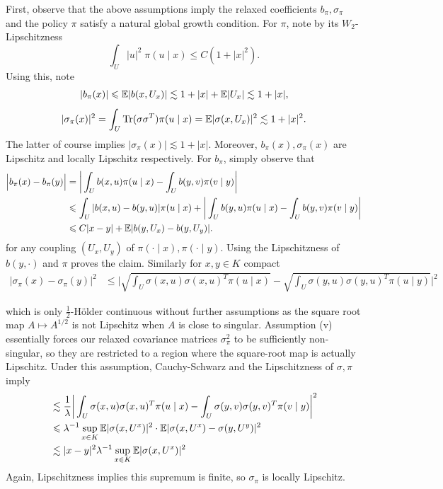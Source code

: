 
First, observe that the above assumptions imply the relaxed coefficients $b_\pi, \sigma_\pi$ and the policy $\pi$ satisfy a natural
global growth condition. For $\pi$, note by its $W_2$-Lipschitzness
%
\[\int_U |u|^2 \; \pi(u \mid x) \leq C(1 + |x|^2).\]
%
\noindent Using this, note
%
\[|b_\pi(x)| \leqslant \mathbb{E} |b(x, U_x)| \lesssim 1 + |x| + \mathbb{E} |U_x| \lesssim 1 + |x|,\]
\[|\sigma_\pi(x)|^2 = \int_U \mathrm{Tr}(\sigma \sigma^T) \pi(u \mid x) = \mathbb{E} | \sigma(x, U_x)|^2 \lesssim 1 + |x|^2.\]
%
\noindent The latter of course implies $|\sigma_\pi(x)| \lesssim 1 + |x|$. Moreover, $b_\pi(x), \sigma_\pi(x)$ are Lipschitz and locally Lipschitz respectively. For $b_\pi$, simply observe that
 \begin{align*}
	\Big|b_\pi(x) - b_\pi(y)\Big| & = \bigg|\int_U b(x,u) \pi(u \mid x) - \int_U b(y,v) \pi(v \mid y) \bigg|\\
	& \leqslant \int_U |b(x,u) - b(y,u)| \pi(u \mid x) + \bigg|\int_U b(y,u) \pi(u \mid x) - \int_U b(y,v) \pi(v \mid y) \bigg|\\
	& \leqslant C |x-y| + \mathbb{E} |b(y, U_x) - b(y, U_y)|.
\end{align*}
 \noindent for any coupling $(U_x, U_y)$ of $\pi(\cdot \mid x), \pi(\cdot \mid y)$. Using the Lipschitzness of
  $b(y, \cdot)$ and $\pi$ proves the claim. Similarly for $x,y \in K$ compact
	\begin{align*}
		\Big| \sigma_\pi(x) - \sigma_\pi(y) \Big|^2 & \leq \bigg|\sqrt{\int_U \sigma(x,u)\sigma(x,u)^T \pi(u \mid x)} - \sqrt{\int_U \sigma(y,u)\sigma(y,u)^T \pi(u \mid y)} \bigg|^2
	\end{align*}

	\noindent which is only $\frac{1}{2}$-H\"older continuous without further assumptions as the square root map $A \mapsto A^{1/2}$ is not Lipschitz when $A$ is close to singular. Assumption (v) essentially
	forces our relaxed covariance matrices $\sigma_\pi^2$ to be sufficiently non-singular, so they are restricted to a region where the square-root map is actually Lipschitz. Under this assumption, Cauchy-Schwarz and the Lipschitzness of $\sigma, \pi$ imply
	\begin{align*}
		& \lesssim \frac{1}{\lambda} \bigg| \int_U \sigma(x,u)\sigma(x,u)^T \pi(u \mid x) - \int_U \sigma(y,v)\sigma(y,v)^T \pi(v \mid y) \bigg|^2 \\
		& \leqslant \lambda^{-1}\sup_{x \in K} \mathbb{E} |\sigma(x, U^x)|^2 \cdot \mathbb{E} |\sigma(x, U^x) - \sigma(y, U^y)|^2\\
		& \lesssim |x-y|^2 \lambda^{-1}\sup_{x \in K} \mathbb{E} |\sigma(x, U^x)|^2
	\end{align*}
	\noindent Again, Lipschitzness implies this supremum is finite, so $\sigma_\pi$ is locally Lipschitz.

